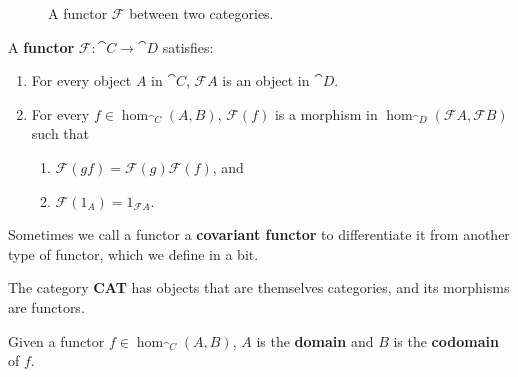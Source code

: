 \documentclass[twoside,10pt]{report}
\begin{document}
\begin{figure}[H]
	\centering
\caption{A functor $\mathcal{F}$ between two categories.}
\end{figure}

\begin{defn}
	A \textbf{functor} $\mathcal{F}:\cat{C}\to \cat{D}$ satisfies:
\begin{enumerate}
	\item For every object $A$ in $\cat{C}$, $\mathcal{F}A$ is an object in $\cat{D}$.
	\item For every $f \in \hom_{\cat{C}}(A,B)$, $\mathcal{F}(f)$ is a morphism in $\hom_{\cat{D}}(\mathcal{F}A, \mathcal{F}B)$ such that
		\begin{enumerate}
			\item $\mathcal{F}(gf) = \mathcal{F}(g) \mathcal{F}(f)$, and
			\item $\mathcal{F}(1_{A}) = 1_{\mathcal{F}A}$.
		\end{enumerate}
\end{enumerate}
	Sometimes we call a functor a \textbf{covariant functor} to differentiate it from another type of functor, which we define in a bit.
\end{defn}

\begin{ex}
The category \textbf{CAT} has objects that are themselves categories, and its morphisms are functors.
\end{ex}

\begin{defn}
	Given a functor $f \in \hom_{\cat{C}}(A,B)$, $A$ is the \textbf{domain} and $B$ is the \textbf{codomain} of $f$.
\end{defn}
\end{document}
